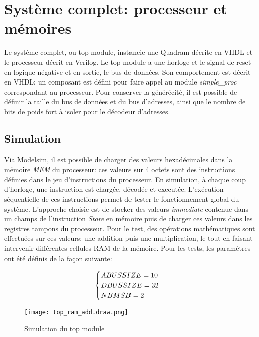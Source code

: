 \section{Système complet: processeur et mémoires}

Le système complet, ou top module, instancie une Quadram décrite en VHDL et le processeur décrit en Verilog. Le top module a une horloge et le signal de reset en logique négative et en sortie, le bus de données. 
Son comportement est décrit en VHDL; un composant est défini pour faire appel au module \textit{simple\_proc} correspondant au processeur.
Pour conserver la générécité, il est possible de définir la taille du bus de données et du bus d'adresses, ainsi que le nombre de bits de poids fort à isoler pour le décodeur d'adresses. \\

\subsection{Simulation}

\indent Via Modelsim, il est possible de charger des valeurs hexadécimales dans la mémoire \textit{MEM} du processeur: ces valeurs sur 4 octets sont des instructions définies dans le jeu d'instructions du processeur.
En simulation, à chaque coup d'horloge, une instruction est chargée, décodée et executée. L'exécution séquentielle de ces instructions permet de tester le fonctionnement global du système.
L'approche choisie est de stocker des valeurs \textit{immediate} contenue dans un champs de l'instruction \textit{Store} en mémoire puis de charger ces valeurs dans les registres tampons du processeur.
Pour le test, des opérations mathématiques sont effectuées sur ces valeurs: une addition puis une multiplication, le tout en faisant intervenir différentes cellules \gls{RAM} de la mémoire.
Pour les tests, les paramètres ont été définis de la façon suivante:

\begin{equation}
	\notag
	 \begin{cases}
		ABUS SIZE = 10 & \\
		DBUS SIZE = 32 & \\
		NB MSB = 2
	\end{cases}
\end{equation}

\begin{figure}[h]
	\centering
	\texttt{[image: top\_ram\_add.draw.png]}
	\caption{Simulation du top module}
	\label{fig:wave_top_module}
\end{figure}

